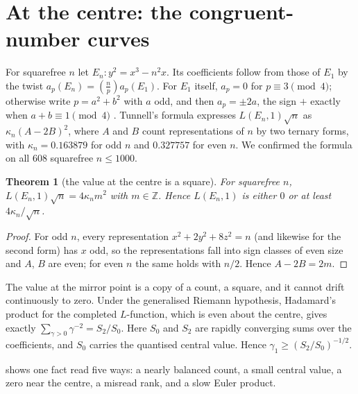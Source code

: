 \documentclass[11pt]{article}
\newtheorem{theorem}{Theorem}[section]
\theoremstyle{definition}\newtheorem{definition}[theorem]{Definition}
\theoremstyle{remark}\newtheorem{remark}[theorem]{Remark}
\newcommand{\Z}{\mathbb Z}\newcommand{\N}{\mathbb N}
\begin{document}
\section{At the centre: the congruent-number curves}\label{sec:centre}

For squarefree $n$ let $E_n:y^2=x^3-n^2x$. Its coefficients follow from those of $E_1$ by the twist $a_p(E_n)=(\tfrac np)a_p(E_1)$. For $E_1$ itself, $a_p=0$ for $p\equiv3\pmod4$; otherwise write $p=a^2+b^2$ with $a$ odd, and then $a_p=\pm2a$, the sign $+$ exactly when $a+b\equiv1\pmod4$ \cite{Koblitz}. Tunnell's formula \cite{Tunnell83} expresses $L(E_n,1)\sqrt n$ as $\kappa_n(A-2B)^2$, where $A$ and $B$ count representations of $n$ by two ternary forms, with $\kappa_n=0.163879$ for odd $n$ and $0.327757$ for even $n$. We confirmed the formula on all $608$ squarefree $n\le1000$.

\begin{theorem}[the value at the centre is a square]\label{thm:square}
For squarefree $n$, $L(E_n,1)\sqrt n=4\kappa_n m^2$ with $m\in\Z$. Hence $L(E_n,1)$ is either $0$ or at least $4\kappa_n/\sqrt n$.
\end{theorem}
\begin{proof}
For odd $n$, every representation $x^2+2y^2+8z^2=n$ (and likewise for the second form) has $x$ odd, so the representations fall into sign classes of even size and $A$, $B$ are even; for even $n$ the same holds with $n/2$. Hence $A-2B=2m$.
\end{proof}

The value at the mirror point is a copy of a count, a square, and it cannot drift continuously to zero. Under the generalised Riemann hypothesis, Hadamard's product for the completed $L$-function, which is even about the centre, gives exactly $\sum_{\gamma>0}\gamma^{-2}=S_2/S_0$. Here $S_0$ and $S_2$ are rapidly converging sums over the coefficients, and $S_0$ carries the quantised central value. Hence $\gamma_1\ge(S_2/S_0)^{-1/2}$.

 shows one fact read five ways: a nearly balanced count, a small central value, a zero near the centre, a misread rank, and a slow Euler product.
\end{document}
